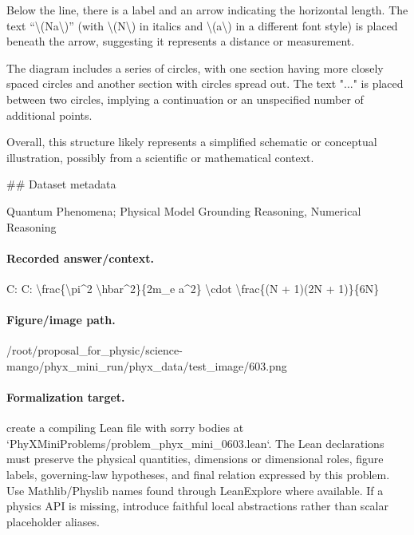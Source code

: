 Below the line, there is a label and an arrow indicating the horizontal length. The text “\textbackslash{}(Na\textbackslash{})” (with \textbackslash{}(N\textbackslash{}) in italics and \textbackslash{}(a\textbackslash{}) in a different font style) is placed beneath the arrow, suggesting it represents a distance or measurement.

The diagram includes a series of circles, with one section having more closely spaced circles and another section with circles spread out. The text "..." is placed between two circles, implying a continuation or an unspecified number of additional points.

Overall, this structure likely represents a simplified schematic or conceptual illustration, possibly from a scientific or mathematical context.

\#\# Dataset metadata

Quantum Phenomena; Physical Model Grounding Reasoning, Numerical Reasoning

\paragraph{Recorded answer/context.}
C: C: \textbackslash{}frac\{\textbackslash{}pi\textasciicircum{}2 \textbackslash{}hbar\textasciicircum{}2\}\{2m\_e a\textasciicircum{}2\} \textbackslash{}cdot \textbackslash{}frac\{(N + 1)(2N + 1)\}\{6N\}

\paragraph{Figure/image path.}
/root/proposal\_for\_physic/science-mango/phyx\_mini\_run/phyx\_data/test\_image/603.png

\paragraph{Formalization target.}
create a compiling Lean file with sorry bodies at `PhyXMiniProblems/problem\_phyx\_mini\_0603.lean`. The Lean declarations must preserve the physical quantities, dimensions or dimensional roles, figure labels, governing-law hypotheses, and final relation expressed by this problem.
Use Mathlib/Physlib names found through LeanExplore where available. If a physics API is missing, introduce faithful local abstractions rather than scalar placeholder aliases.

